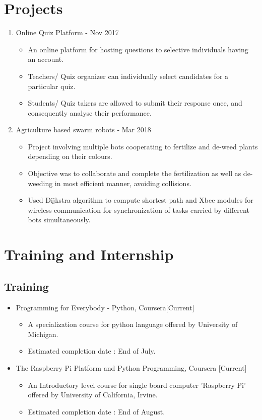 \documentclass[11pt,a4paper,sans]{moderncv}        %
\begin{document}
\section{Projects}
\begin{enumerate}
	\item Online Quiz Platform - Nov 2017 
	\begin{itemize}
		\item An online platform for hosting questions to selective individuals having an account.
		\item Teachers/ Quiz organizer can individually select candidates for a particular quiz.
		\item Students/ Quiz takers are allowed to submit their response once, and consequently analyse their performance. 
	\end{itemize}
    \item Agriculture based swarm robots - Mar 2018
    \begin{itemize}
    	\item Project involving multiple bots cooperating to fertilize and de-weed plants depending on their colours. 
    	\item Objective was to collaborate and complete the fertilization as well as de-weeding in most efficient manner, avoiding collisions.  
    	\item Used Dijkstra algorithm to compute shortest path and Xbee modules for wireless communication for synchronization of tasks carried by different bots simultaneously. 
    \end{itemize}
\end{enumerate}
\section{Training and Internship}
\subsection{Training}
\begin{itemize}
	\item Programming for Everybody - Python, Coursera[Current] 
	\begin{itemize}
		\item A specialization course for python language offered by University of Michigan.
		\item Estimated completion date : End of July.
	\end{itemize}
	\item The Raspberry Pi Platform and Python Programming, Coursera [Current]
	 	\begin{itemize}
	 	\item An Introductory level course for single board computer 'Raspberry Pi' offered by University of California, Irvine.
	 	\item Estimated completion date : End of August.
	 \end{itemize}
\end{itemize}
\end{document}

